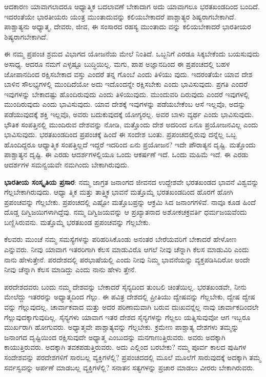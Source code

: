 ಆದಕಾರಣ ಯಾವಾಗಲಾದರೂ ಆಧ್ಯಾತ್ಮಿಕ ಬದಲಾವಣೆ ಬೇಕಾದಾಗ ಅದು ಯಾವಾಗಲೂ ಭರತಖಂಡದಿಂದ ಬಂದಿದೆ. ಇದರಂತೆಯೇ ಭಾರತೀಯರು ಯಂತ್ರ ಮುಂತಾದುವನ್ನು ಕಲಿಯಬೇಕಾದರೆ ಪಾಶ್ಚಾತ್ಯರ ಶಿಷ್ಯರಾಗಬೇಕಾಗಿದೆ. ಪಾಶ್ಚಾತ್ಯನು ಅಧ್ಯಾತ್ಮ, ದೇವರು, ಜೀವ, ಈ ಸಂಸಾರದ ರಹಸ್ಯ ಮುಂತಾದು ವನ್ನು ಕಲಿಯಬೇಕಾದರೆ ಭಾರತೀಯರ ಶಿಷ್ಯರಾಗಬೇಕಾಗಿದೆ.

ಈ ನಮ್ಮ ಪ್ರಪಂಚ ಶ್ರಮದ ವಿಭಾಗದ ಯೋಜನೆಯ ಮೇಲೆ ನಿಂತಿದೆ. ಒಬ್ಬನಿಗೆ ಎರಡೂ ಸಿಕ್ಕಬೇಕೆಂದು ಬಯಸುವುದು ಅಸಾಧ್ಯ. ಆದರೂ ನಮಗೆ ಎಳ್ಳಷ್ಟೂ ಬುದ್ಧಿಯಿಲ್ಲ. ಮಗು, ಪಾಪ ಅಜ್ಞಾನದಿಂದ ಈ ಪ್ರಪಂಚದಲ್ಲಿ ಬಹಳ ಜೋಪಾನದಿಂದ ರಕ್ಷಿಸಬೇಕಾದ ವಸ್ತು ಎಂದರೆ ತನ್ನ ಗೊಂಬೆ ಎಂದು ತಿಳಿಯು ವುದು. ಇದರಂತೆಯೇ ಯಾವ ದೇಶ ಬಾಳಿನ ಸೌಲಭ್ಯಗಳಲ್ಲಿ ಮುಂದಿದೆಯೋ ಅದು ಇದೊಂದನ್ನೇ ರಕ್ಷಿಸಬೇಕು ಎಂದು ಭಾವಿಸುವುದು. ಪ್ರಗತಿ ಎಂದರೆ ಇವುಗಳನ್ನು ಬೇಕಾದಷ್ಟು ಹೊಂದಿರುವುದು ಎಂದು ತಿಳಿಯುವುದು. ಮುಂದುವರಿ ದಿರುವುದು ಎಂದರೆ ಇವುಗಳಲ್ಲಿ ಮುಂದಿರುವುದು ಎಂದು ಭಾವಿಸುವುದು. ಯಾವ ದೇಶಕ್ಕೆ ಇವುಗಳನ್ನು ಪಡೆಯಬೇಕೆಂಬ ಆಸೆ ಇಲ್ಲವೊ, ಅದನ್ನು ಪಡೆಯುವುದಕ್ಕೆ ಶಕ್ತಿ ಇಲ್ಲವೊ, ಅವರು ಬದುಕುವುದಕ್ಕೆ ಯೋಗ್ಯರಲ್ಲ. ಅವರ ಬಾಳು ವ್ಯರ್ಥ ಎಂದು ಭಾವಿಸುವುದು. ಭೌತಿಕ ಸಂಪತ್ತಿನಲ್ಲಿ ಮುಂದಿರುವ ದೇಶವನ್ನು ನೋಡಿ, ಮತ್ತೊಂದು ದೇಶ ಅದರಿಂದ ಏನೂ ಪ್ರಯೋಜನವಿಲ್ಲ ಎಂದು ಭಾವಿಸುವುದು. ಭರತಖಂಡದಿಂದ ಪ್ರಪಂಚಕ್ಕೆ ಹಿಂದೆ ಈ ಸಂದೇಶ ಬಂತು. ಪ್ರಪಂಚದಲ್ಲಿರುವು ದನ್ನೆಲ್ಲ ಒಬ್ಬ ಹೊಂದಿದ್ದರೂ ಆಧ್ಯಾತ್ಮಿಕ ಸಂಪತ್ತಿಲ್ಲದೆ ಇದ್ದರೆ ಇದರಿಂದ ಏನು ಪ್ರಯೋಜನ? ಇದೇ ಪೌರಾತ್ಯನ ದೃಷ್ಟಿ. ಮತ್ತೊಂದು ಪಾಶ್ಚಾತ್ಯನ ದೃಷ್ಟಿ. ಈ ಎರಡು ಆದರ್ಶಗಳಲ್ಲಿಯೂ ಒಂದು ಆಕರ್ಷಣೆ ಇದೆ. ಒಂದು ಮಹಿಮೆ ಇದೆ. ಈ ಎರಡು ಆದರ್ಶಗಳ ಸಮನ್ವಯವೇ ನಮಗಿಂದು ಬೇಕಾಗಿರುವುದು.

\textbf{ಭಾರತೀಯ ಸಂಸ್ಕೃತಿಯ ಪ್ರಸಾರ}: ನಮ್ಮ ಜಾಗ್ರತ ಜನಾಂಗದ ಜೀವನದ ಉದ್ದೇಶವೇ ಭರತಖಂಡದ ಭಾವನೆ ವಿಶ್ವವನ್ನು ಗೆಲ್ಲಬೇಕಾಗಿರುವುದು. ಆಧ್ಯಾ ತ್ಮಿಕ ಮತ್ತು ತಾತ್ತ್ವಿಕ ಭಾವನೆ ಮತ್ತೊಮ್ಮೆ ಭರತಖಂಡದಿಂದ ಹೊರಗೆ ಹೋಗಿ ಪ್ರಪಂಚವನ್ನು ಗೆಲ್ಲಬೇಕು. ಪ್ರಪಂಚದಲ್ಲಿ ಎಷ್ಟೋ ಮತ್ತೊಬಪ್ರನ್ನು ಆಕ್ರಮಿ ಸಿದ ಜನಾಂಗಗಳಿವೆ. ನಾವೂ ಕೂಡ ಹಿಂದೆ ದೊಡ್ಡ ದಿಗ್ವಿಜಯಿಗಳಾಗಿದ್ದೆವು. ನಮ್ಮ ದಿಗ್ವಿಜಯವನ್ನು ಆ ಪ್ರಖ್ಯಾತನಾದ ಅಶೋಕಚಕ್ರವರ್ತಿ ಧರ್ಮಜಯವೆಂದು ಬಣ್ಣಿಸಿರುವನು. ಮತ್ತೊಮ್ಮೆ ಭರತಖಂಡ ಪ್ರಪಂಚವನ್ನು ಗೆಲ್ಲಬೇಕು.

ಕೆಲವರು ಮುಂಚೆ ನಮ್ಮ ಸಮಸ್ಯೆಗಳನ್ನು ಪರಿಹರಿಸಿಕೊಂಡು ಅನಂತರ ಬೇರೆಯವರಿಗೆ ಬೇಕಾದರೆ ಹೇಳೋಣ ಎನ್ನುವರು. ನೀವು ಯಾವಾಗ ಇತರರಿಗಾಗಿ ಕೆಲಸ ಮಾಡುವಿರೊ ಆಗಲೆ ನೀವು ಚೆನ್ನಾಗಿ ಕೆಲಸ ಮಾಡುವಿರಿ ಎಂದು ನಾನು ಹೇಳುತ್ತೇನೆ. ಪರದೇಶದಲ್ಲಿ ಪರಭಾಷೆಯಲ್ಲಿ ಎಂದು ನೀವು ನಿಮ್ಮ ಭಾವನೆಯನ್ನು ವ್ಯಕ್ತಪಡಿಸಿದಿರೋ ಅಂದೇ ನೀವು ಚೆನ್ನಾಗಿ ಕೆಲಸ ಮಾಡಿದ್ದು ಎಂದು ನಾನು ಹೇಳು ತ್ತೇನೆ.

ಪರದೇಶದವರು ಬಂದು ನಮ್ಮ ದೇಶವನ್ನು ಬೇಕಾದರೆ ಸೈನ್ಯದಿಂದ ತುಂಬಲಿ ಚಿಂತೆಯಿಲ್ಲ. ಭರತಖಂಡವೇ, ನೀನು ಮೇಲೆದ್ದು ಇತರರನ್ನು ಅಧ್ಯಾತ್ಮದಿಂದ ಗೆಲ್ಲು. ಈ ಪವಿತ್ರ ದೇಶದಲ್ಲಿ ಪ್ರೀತಿಯು ದ್ವೇಷವನ್ನು ಗೆಲ್ಲಬೇಕು, ದ್ವೇಷ ದ್ವೇಷ ವನ್ನು ಗೆಲ್ಲುವುದಲ್ಲ. ಚಾರ್ವಾಕವಾದ ಮತ್ತು ಅದರ ಪರಿಣಾಮವಾಗಿ ಬರುವ ದುಃಖವನ್ನೆಲ್ಲ ನಾವು ಚಾರ್ವಾಕದಿಂದಲೇ ಗೆಲ್ಲುವುದಕ್ಕಾಗುವುದಿಲ್ಲ. ಸೈನ್ಯಗಳು ಯಾವಾಗ ಇತರ ದೇಶದ ಸೈನ್ಯಗಳನ್ನು ಗೆಲ್ಲಲು ಯತ್ನಿಸುವುವೋ ಆಗ ಇಬ್ಬರೂ ಮುರ್ಖರಾಗಿ ಹೋಗುವರು. ಅಧ್ಯಾತ್ಮವೇ ಪಾಶ್ಚಾತ್ಯವನ್ನು ಗೆಲ್ಲಬೇಕು. ಕ್ರಮೇಣ ಪಾಶ್ಚಾತ್ಯ ದೇಶಗಳು ತಮ್ಮನ್ನು ಜನಾಂಗದ ದೃಷ್ಟಿಯಿಂದ ರಕ್ಷಿಸುವುದೇ ಅಧ್ಯಾತ್ಮ ಎಂಬುದನ್ನು ಮನಗಾಣುತ್ತಿರುವರು. ಅವರು ಅದಕ್ಕಾಗಿ ಕಾಯುತ್ತಿರುವರು. ಅದಕ್ಕಾಗಿ ತವಕಪಡುತ್ತಿರುವರು. ಅದು ಎಲ್ಲಿಂದ ಬರಬೇಕು? ನಮ್ಮ ಪೂರ್ವ ಕಾಲದ ಪುಷಿಗಳ ಸಂದೇಶವನ್ನು ಪರದೇಶಗಳಿಗೆ ಸಾರಬಲ್ಲ ವ್ಯಕ್ತಿಗಳೆಲ್ಲಿ? ಪ್ರಪಂಚದದಲ್ಲಿ ಮೂಲೆ ಮೂಲೆಗೆ ಸಾರುವುದಕ್ಕೆ ಅದಕ್ಕಾಗಿ ತಮ್ಮ ಸರ್ವಸ್ವವನ್ನು ಅರ್ಪಣೆ ಮಾಡಬಲ್ಲ ವ್ಯಕ್ತಿಗಳೆಲ್ಲಿ? ಸನಾತನ ಸತ್ಯಗಳನ್ನು ಪ್ರಚಾರ ಮಾಡಲು ವೀರರು ಬೇಕಾಗಿರುವರು.

